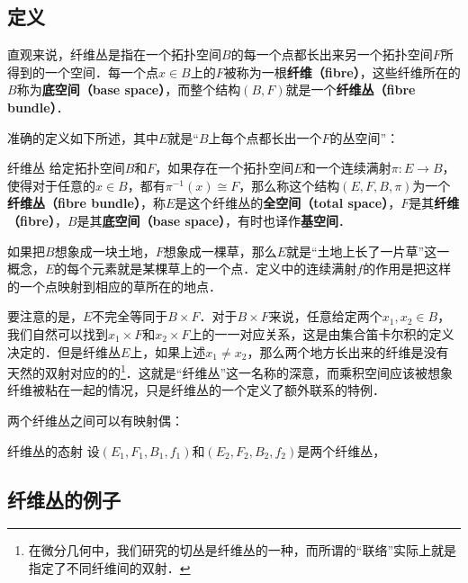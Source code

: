 
\begin{issues}
\issueDraft
\end{issues}


\subsection{定义}

直观来说，纤维丛是指在一个拓扑空间$B$的每一个点都长出来另一个拓扑空间$F$所得到的一个空间．每一个点$x\in B$上的$F$被称为一根\textbf{纤维（fibre）}，这些纤维所在的$B$称为\textbf{底空间（base space）}，而整个结构$(B, F)$就是一个\textbf{纤维丛（fibre bundle）}．

准确的定义如下所述，其中$E$就是“$B$上每个点都长出一个$F$的丛空间”：

\begin{definition}{纤维丛}
给定拓扑空间$B$和$F$，如果存在一个拓扑空间$E$和一个连续满射$\pi:E\rightarrow B$，使得对于任意的$x\in B$，都有$\pi^{-1}(x)\cong F$，那么称这个结构$(E, F, B, \pi)$为一个\textbf{纤维丛（fibre bundle）}，称$E$是这个纤维丛的\textbf{全空间（total space）}，$F$是其\textbf{纤维（fibre）}，$B$是其\textbf{底空间（base space）}，有时也译作\textbf{基空间}．
\end{definition}

如果把$B$想象成一块土地，$F$想象成一棵草，那么$E$就是“土地上长了一片草”这一概念，$E$的每个元素就是某棵草上的一个点．定义中的连续满射$f$的作用是把这样的一个点映射到相应的草所在的地点．

要注意的是，$E$不完全等同于$B\times F$．对于$B\times F$来说，任意给定两个$x_1, x_2\in B$，我们自然可以找到$x_1\times F$和$x_2\times F$上的一一对应关系，这是由集合笛卡尔积的定义决定的．但是纤维丛$E$上，如果上述$x_1\not=x_2$，那么两个地方长出来的纤维是没有天然的双射对应的的\footnote{在微分几何中，我们研究的切丛是纤维丛的一种，而所谓的“联络”实际上就是指定了不同纤维间的双射．}．这就是“纤维丛”这一名称的深意，而乘积空间应该被想象纤维被粘在一起的情况，只是纤维丛的一个定义了额外联系的特例．

两个纤维丛之间可以有映射偶：

\begin{definition}{纤维丛的态射}
设$(E_1, F_1, B_1, f_1)$和$(E_2, F_2, B_2, f_2)$是两个纤维丛，
\end{definition}

\subsection{纤维丛的例子}

